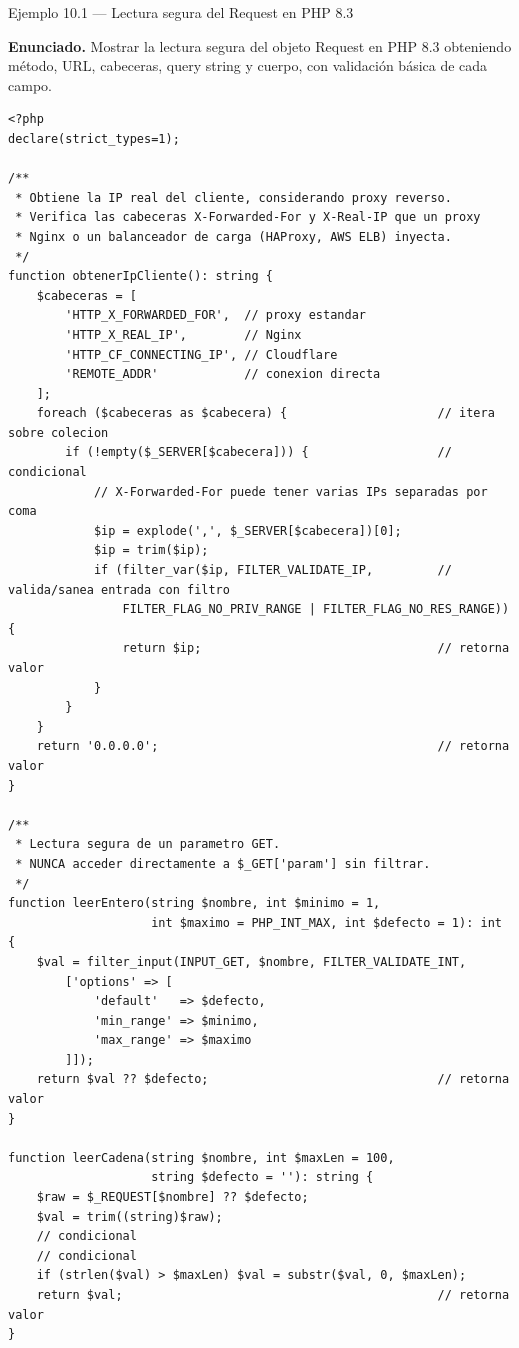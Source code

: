 \documentclass[11pt,a4paper,openany]{book}
\begin{document}
\begin{cajaejemplo}{Ejemplo 10.1 --- Lectura segura del Request en PHP 8.3}

\textbf{Enunciado.} Mostrar la lectura segura del objeto Request en PHP 8.3 obteniendo método, URL, cabeceras, query string y cuerpo, con validación básica de cada campo.

\begin{lstlisting}[style=php,caption={request-helpers.php},label=lst:10.4]
<?php
declare(strict_types=1);

/**
 * Obtiene la IP real del cliente, considerando proxy reverso.
 * Verifica las cabeceras X-Forwarded-For y X-Real-IP que un proxy
 * Nginx o un balanceador de carga (HAProxy, AWS ELB) inyecta.
 */
function obtenerIpCliente(): string {
    $cabeceras = [
        'HTTP_X_FORWARDED_FOR',  // proxy estandar
        'HTTP_X_REAL_IP',        // Nginx
        'HTTP_CF_CONNECTING_IP', // Cloudflare
        'REMOTE_ADDR'            // conexion directa
    ];
    foreach ($cabeceras as $cabecera) {                     // itera sobre colecion
        if (!empty($_SERVER[$cabecera])) {                  // condicional
            // X-Forwarded-For puede tener varias IPs separadas por coma
            $ip = explode(',', $_SERVER[$cabecera])[0];
            $ip = trim($ip);
            if (filter_var($ip, FILTER_VALIDATE_IP,         // valida/sanea entrada con filtro
                FILTER_FLAG_NO_PRIV_RANGE | FILTER_FLAG_NO_RES_RANGE)) {
                return $ip;                                 // retorna valor
            }
        }
    }
    return '0.0.0.0';                                       // retorna valor
}

/**
 * Lectura segura de un parametro GET.
 * NUNCA acceder directamente a $_GET['param'] sin filtrar.
 */
function leerEntero(string $nombre, int $minimo = 1,
                    int $maximo = PHP_INT_MAX, int $defecto = 1): int {
    $val = filter_input(INPUT_GET, $nombre, FILTER_VALIDATE_INT,
        ['options' => [
            'default'   => $defecto,
            'min_range' => $minimo,
            'max_range' => $maximo
        ]]);
    return $val ?? $defecto;                                // retorna valor
}

function leerCadena(string $nombre, int $maxLen = 100,
                    string $defecto = ''): string {
    $raw = $_REQUEST[$nombre] ?? $defecto;
    $val = trim((string)$raw);
    // condicional
    // condicional
    if (strlen($val) > $maxLen) $val = substr($val, 0, $maxLen);
    return $val;                                            // retorna valor
}


\end{lstlisting}
\end{cajaejemplo}
\end{document}
